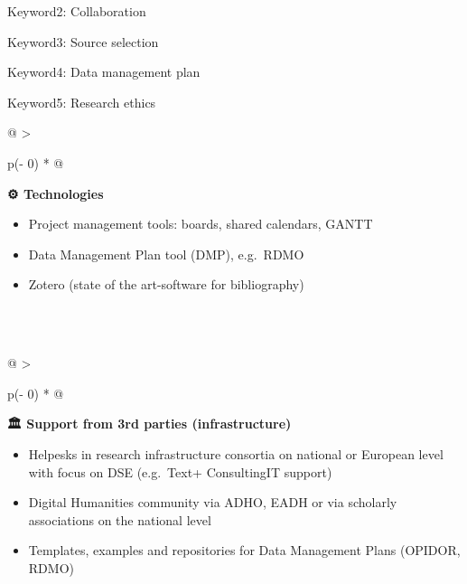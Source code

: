\documentclass[
  letterpaper,
  DIV=11,
  numbers=noendperiod]{scrreprt}
\begin{document}
Keyword2: Collaboration

Keyword3: Source selection

Keyword4: Data management plan

Keyword5: Research ethics

\begin{longtable}[]{@{}
  >{\raggedright\arraybackslash}p{(\columnwidth - 0\tabcolsep) * }@{}}
\toprule\noalign{}
\begin{minipage}[b]{\linewidth}\raggedright
\textbf{⚙️ Technologies} \textbar{}

\begin{itemize}
\item
  Project management tools: boards, shared calendars, GANTT
\item
  Data Management Plan tool (DMP), e.g.~RDMO
\item
  Zotero (state of the art-software for bibliography)
\end{itemize}
\end{minipage} \\
\midrule\noalign{}
\endhead
\bottomrule\noalign{}
\endlastfoot
 \\
\end{longtable}

\begin{longtable}[]{@{}
  >{\raggedright\arraybackslash}p{(\columnwidth - 0\tabcolsep) * }@{}}
\toprule\noalign{}
\begin{minipage}[b]{\linewidth}\raggedright
\textbf{🏛️ Support from 3rd parties (infrastructure)} \textbar{}

\begin{itemize}
\item
  Helpesks in research infrastructure consortia on national or European
  level with focus on DSE (e.g.~Text+ ConsultingIT support)
\item
  Digital Humanities community via ADHO, EADH or via scholarly
  associations on the national level
\item
  Templates, examples and repositories for Data Management Plans
  (OPIDOR, RDMO)
\end{itemize}
\end{minipage} \\
\midrule\noalign{}
\endhead
\bottomrule\noalign{}
\endlastfoot
 \\
\end{longtable}
\end{document}
